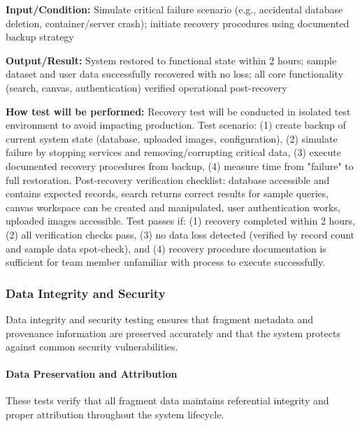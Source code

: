 \documentclass[12pt, titlepage]{article}
\begin{document}
\begin{enumerate}
\textbf{Input/Condition:} Simulate critical failure scenario (e.g., accidental database deletion, container/server crash); initiate recovery procedures using documented backup strategy

\textbf{Output/Result:} System restored to functional state within 2 hours; sample dataset and user data successfully recovered with no loss; all core functionality (search, canvas, authentication) verified operational post-recovery

\textbf{How test will be performed:} Recovery test will be conducted in isolated test environment to avoid impacting production. Test scenario: (1) create backup of current system state (database, uploaded images, configuration), (2) simulate failure by stopping services and removing/corrupting critical data, (3) execute documented recovery procedures from backup, (4) measure time from "failure" to full restoration. Post-recovery verification checklist: database accessible and contains expected records, search returns correct results for sample queries, canvas workspace can be created and manipulated, user authentication works, uploaded images accessible. Test passes if: (1) recovery completed within 2 hours, (2) all verification checks pass, (3) no data loss detected (verified by record count and sample data spot-check), and (4) recovery procedure documentation is sufficient for team member unfamiliar with process to execute successfully.

\end{enumerate}

\subsubsection{Data Integrity and Security}

Data integrity and security testing ensures that fragment metadata and provenance information are preserved accurately and that the system protects against common security vulnerabilities.

\paragraph{Data Preservation and Attribution}

These tests verify that all fragment data maintains referential integrity and proper attribution throughout the system lifecycle.
\end{document}
